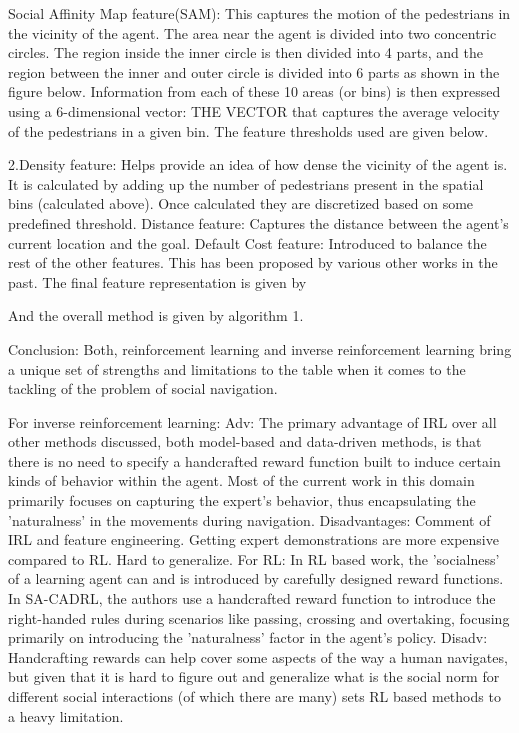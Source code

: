 Social Affinity Map feature(SAM): This captures the motion of the pedestrians in the vicinity of the agent. The area near the agent is divided into two concentric circles. The region inside the inner circle is then divided into 4 parts, and the region between the inner and outer circle is divided into 6 parts as shown in the figure below.
Information from each of these 10 areas (or bins) is then expressed using a 6-dimensional vector:
THE VECTOR	
that captures the average velocity of the pedestrians in a given bin. The feature thresholds used are given below.

2.Density feature: Helps provide an idea of how dense the vicinity of the agent is. It is calculated by adding up the number of pedestrians present in the spatial bins (calculated above). Once calculated they are discretized based on some predefined threshold.
Distance feature: Captures the distance between the agent's current location and the goal.
Default Cost feature: Introduced to balance the rest of the other features. This has been proposed by various other works in the past.
The final feature representation is given by 

And the overall method is given by algorithm 1.


Conclusion:
Both, reinforcement learning and inverse reinforcement learning bring a unique set of strengths and limitations to the table when it comes to the tackling of the problem of social navigation. 

For inverse reinforcement learning:
Adv:
The primary advantage of IRL over all other methods discussed, both model-based and data-driven methods, is that there is no need to specify a handcrafted reward function built to induce certain kinds of behavior within the agent. Most of the current work in this domain primarily focuses on capturing the expert's behavior, thus encapsulating the 'naturalness' in the movements during navigation.
Disadvantages:
Comment of IRL and feature engineering. 
Getting expert demonstrations are more expensive compared to RL.
Hard to generalize. 
For RL:
In RL based work, the 'socialness' of a learning agent can and is introduced by carefully designed reward functions. In SA-CADRL, the authors use a handcrafted reward function to introduce the right-handed rules during scenarios like passing, crossing and overtaking, focusing primarily on introducing the 'naturalness' factor in the agent's policy.
Disadv:
Handcrafting rewards can help cover some aspects of the way a human navigates, but given that it is hard to figure out and generalize what is the social norm for different social interactions (of which there are many) sets RL based methods to a heavy limitation.